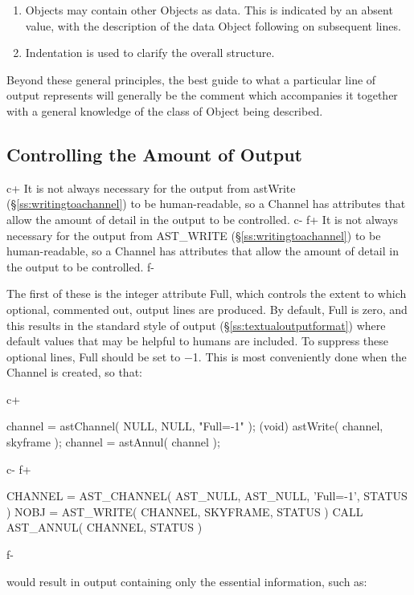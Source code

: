 \documentclass[twoside,11pt]{starlink}
\providecommand{\secref}[1]{\S\ref{#1}}
\begin{document}
{\begin{enumerate}
\item Objects may contain other Objects as data. This is
indicated by an absent value, with the description of the data
Object following on subsequent lines.

\item Indentation is used to clarify the overall structure.
\end{enumerate}

Beyond these general principles, the best guide to what a particular
line of output represents will generally be the comment which
accompanies it together with a general knowledge of the class of
Object being described.

\subsection{\label{ss:controllingchanneloutput}Controlling the Amount of Output}

c+
It is not always necessary for the output from astWrite
(\secref{ss:writingtoachannel}) to be human-readable, so a Channel has
attributes that allow the amount of detail in the output to be
controlled.
c-
f+
It is not always necessary for the output from AST\_WRITE
(\secref{ss:writingtoachannel}) to be human-readable, so a Channel has
attributes that allow the amount of detail in the output to be
controlled.
f-

The first of these is the integer attribute Full, which controls the
extent to which optional, commented out, output lines are produced. By
default, Full is zero, and this results in the standard style of
output (\secref{ss:textualoutputformat}) where default values that may
be helpful to humans are included. To suppress these optional lines,
Full should be set to $-$1. This is most conveniently done when the
Channel is created, so that:

c+
\small
\begin{terminalv}
channel = astChannel( NULL, NULL, "Full=-1" );
(void) astWrite( channel, skyframe );
channel = astAnnul( channel );
\end{terminalv}
\normalsize
c-
f+
\small
\begin{terminalv}
      CHANNEL = AST_CHANNEL( AST_NULL, AST_NULL, 'Full=-1', STATUS )
      NOBJ = AST_WRITE( CHANNEL, SKYFRAME, STATUS )
      CALL AST_ANNUL( CHANNEL, STATUS )
\end{terminalv}
\normalsize
f-

would result in output containing only the essential information, such
as:

}
\end{document}
